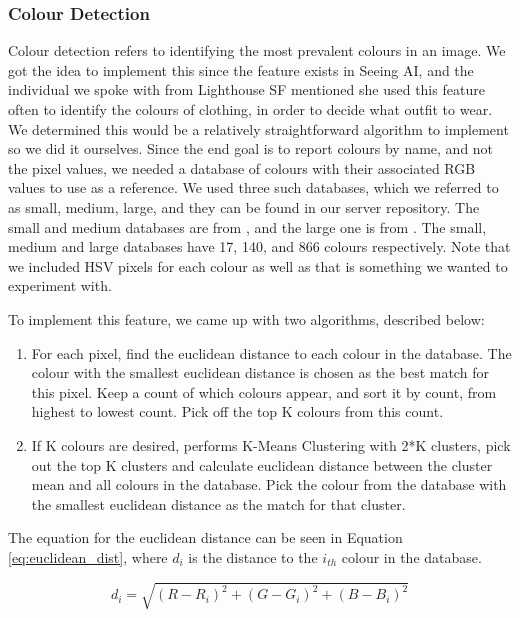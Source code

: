 \documentclass[a4paper,11pt]{article}
\begin{document}
\subsubsection{Colour Detection}
Colour detection refers to identifying the most prevalent colours in an image. We got the idea to implement this since the feature exists in Seeing AI, and the individual we spoke with from Lighthouse SF mentioned she used this feature often to identify the colours of clothing, in order to decide what outfit to wear. We determined this would be a relatively straightforward algorithm to implement so we did it ourselves. Since the end goal is to report colours by name, and not the pixel values, we needed a database of colours with their associated RGB values to use as a reference. We used three such databases, which we referred to as small, medium, large, and they can be found
\href{https://github.com/vizia-fydp/server/tree/main/color_detection}{\color{blue}{here}}
 in our server repository. The small and medium databases are from \cite{color-small-medium}, and the large one is from \cite{color-large}. The small, medium and large databases have 17, 140, and 866 colours respectively. Note that we included HSV pixels for each colour as well as that is something we wanted to experiment with.

To implement this feature, we came up with two algorithms, described below:

\newpage
\begin{enumerate}
    \item For each pixel, find the euclidean distance to each colour in the database. The colour with the smallest euclidean distance is chosen as the best match for this pixel. Keep a count of which colours appear, and sort it by count, from highest to lowest count. Pick off the top K colours from this count.
    \item If K colours are desired, performs K-Means Clustering \cite{k-means-wikipedia, k-means-opencv} with 2*K clusters, pick out the top K clusters and calculate euclidean distance between the cluster mean and all colours in the database. Pick the colour from the database with the smallest euclidean distance as the match for that cluster.
\end{enumerate}

The equation for the euclidean distance can be seen in Equation \ref{eq:euclidean_dist}, where $d_i$ is the distance to the $i_{th}$ colour in the database. 

\begin{equation}
\label{eq:euclidean_dist}
d_i=\sqrt{(R - R_i)^2 + (G - G_i)^2 + (B - B_i)^2}
\end{equation}
\end{document}
